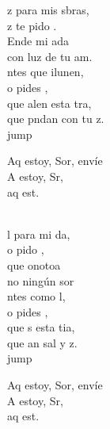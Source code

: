 \begin{cancion}[Envíame][Ixcís]%
	z para mis sbras,\\
	z te pido . \\
	Ende mi ada\\
	con  luz de tu am.\\
	ntes que ilunen, \\
	o pides , \\
	que alen esta tra,\\
	que pndan con tu z.\\jump\\
	\begin{chorus}%
	Aq estoy, Sor, envíe  \\
	A estoy, Sr, \\
	aq est.  \\
	\end{chorus}%
	\jump\\
	l para mi da,\\
	o pido , \\
	que onotoa \\
	no  ningún sor\\
	ntes como l,\\
	o pides , \\
	que s esta tia,\\
	que an sal y z.\\jump\\
	\begin{chorus}%
	Aq estoy, Sor, envíe  \\
	A estoy, Sr, \\
	aq est.  \\

\end{chorus}
\end{cancion}
